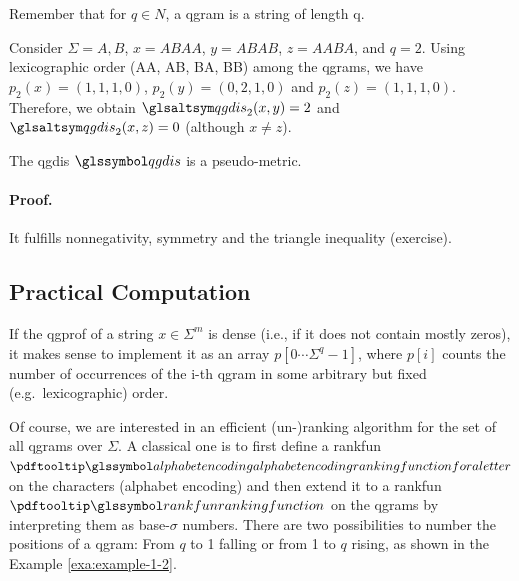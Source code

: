 Remember that for $q \in N$, a \gls{qgram} is a string of length q.



\begin{bsp} \label{exa:example-1-1}
Consider $\Sigma = {A, B}$, $x = ABAA$, $y = ABAB$, $z = AABA$, and $q = 2$.
Using lexicographic order (AA, AB, BA, BB) among the \glspl{qgram}, we have $p_2(x) = (1, 1, 1, 0)$, $p_2(y) = (0, 2, 1, 0)$ 
and $p_2(z) = (1, 1, 1, 0)$.
Therefore, we obtain $\dqgen_2(x, y) = 2$ and $\dqgen_2(x, z) =0$ (although $x\neq z$).
\end{bsp}

\begin{theo}
The \gls{qgdis} $\dqu$ is a pseudo-metric.
\paragraph{Proof.} It fulfills nonnegativity, symmetry and the triangle inequality (exercise). 
\end{theo}

\subsection{Practical Computation}\label{subsec:practical-computation}
If the \gls{qgprof} of a string $x \in \Sigma^m$ is \gls{dense} (i.e., if it does not contain mostly zeros), it
makes sense to implement it as an array $p\left[0 \cdots \Sigma^q - 1\right]$, where $p[i]$ counts the number of occurrences of the
i-th \gls{qgram} in some arbitrary but fixed (e.g.\ lexicographic) order.







Of course, we are interested in an efficient (un-)ranking algorithm for the set of all \glspl{qgram} over $\Sigma$.
A classical one is to first define a \gls{rankfun} $\rfs$ on the characters (alphabet encoding) and then
extend it to a \gls{rankfun} $\rf$ on the \glspl{qgram} by interpreting them as base-$\sigma$ numbers.
There are two possibilities to number the positions of a \gls{qgram}: From $q$ to 1 falling or from 1 to
$q$ rising, as shown in the Example \autoref{exa:example-1-2}.

